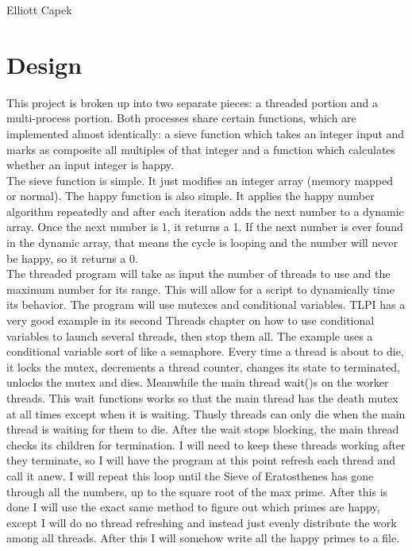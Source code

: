 \documentclass[11pt]{article}
\begin{document}
Elliott Capek \\

\section{Design}
This project is broken up into two separate pieces: a threaded portion and a multi-process portion. Both processes share certain functions, which are implemented almost identically: a sieve function which takes an integer input and marks as composite all multiples of that integer and a function which calculates whether an input integer is happy.\\

The sieve function is simple. It just modifies an integer array (memory mapped or normal). The happy function is also simple. It applies the happy number algorithm repeatedly and after each iteration adds the next number to a dynamic array. Once the next number is 1, it returns a 1. If the next number is ever found in the dynamic array, that means the cycle is looping and the number will never be happy, so it returns a 0.\\

The threaded program will take as input the number of threads to use and the maximum number for its range. This will allow for a script to dynamically time its behavior. The program will use mutexes and conditional variables. TLPI has a very good example in its second Threads chapter on how to use conditional variables to launch several threads, then stop them all. The example uses a conditional variable sort of like a semaphore. Every time a thread is about to die, it locks the mutex, decrements a thread counter, changes its state to terminated, unlocks the mutex and dies. Meanwhile the main thread wait()s on the worker threads. This wait functions works so that the main thread has the death mutex at all times except when it is waiting. Thusly threads can only die when the main thread is waiting for them to die. After the wait stops blocking, the main thread checks its children for termination. I will need to keep these threads working after they terminate, so I will have the program at this point refresh each thread and call it anew. I will repeat this loop until the Sieve of Eratosthenes has gone through all the numbers, up to the square root of the max prime. After this is done I will use the exact same method to figure out which primes are happy, except I will do no thread refreshing and instead just evenly distribute the work among all threads. After this I will somehow write all the happy primes to a file.\\
\end{document}
